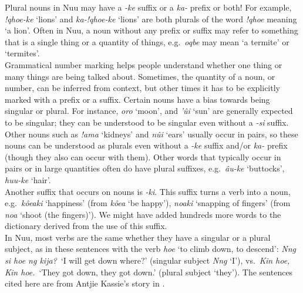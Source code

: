 Plural nouns in N\textipa{\textvertline}uu may have a \emph{-ke}
suffix or a \emph{ka-} prefix or both! For example, \emph{!qhoe-ke}
`lions' and \emph{ka-!qhoe-ke} `lions' are both plurals of the word
\emph{!qhoe} meaning `a lion'. Often in N\textipa{\textvertline}uu, a
noun without any prefix or suffix may refer to something that is a
single thing or a quantity of things, e.g.\
\emph{\textipa{\textdoublevertline}oqbe} may mean `a termite' or
`termites'.\\

Grammatical number marking helps people understand whether one thing
or many things are being talked about. Sometimes, the quantity of a
noun, or number, can be inferred from context, but other times it has
to be explicitly marked with a prefix or a suffix. Certain nouns have
a bias towards being singular or plural. For instance,
\emph{\textipa{\textdoublebarpipe}oro} `moon', and
\emph{\textipa{\textdoublevertline}'\^{u}i} `sun' are generally
expected to be singular; they can be understood to be singular even
without a \emph{-si} suffix. Other nouns such as \emph{!ama} `kidneys'
and \emph{n\textipa{\textdoublebarpipe}\^{u}i} `ears' usually occur in
pairs, so these nouns can be understood as plurals even without a
\emph{-ke} suffix and/or \emph{ka-} prefix (though they also can occur
with them). Other words that typically occur in pairs or in large
quantities often do have plural suffixes, e.g.\
\emph{\textipa{\textdoublebarpipe}\^{a}u-ke} `buttocks',
\emph{\textipa{\textvertline}huu-ke} `hair'.\\

Another suffix that occurs on nouns is \emph{-ki}. This suffix turns a
verb into a noun, e.g.\ \emph{k\^{o}eaki} `happiness' (from
\emph{k\^{o}ea} `be happy'), \emph{n\textipa{\textdoublebarpipe}oaki}
`snapping of fingers' (from \emph{n\textipa{\textdoublebarpipe}oa}
`shoot (the fingers)'). We might have added hundreds more words to the
dictionary derived from the use of this suffix.\\

In N\textipa{\textvertline}uu, most verbs are the same whether they
have a singular or a plural subject, as in these sentences with the
verb \emph{\textipa{\textdoublevertline}hoe} `to climb down, to
descend': \emph{N\textipa{\textvertline}ng si
\textipa{\textdoublevertline}hoe ng kija?}\ `I will get down where?'
(singular subject \emph{N\textipa{\textvertline}ng} `I'), vs.\
\emph{Kin \textipa{\textdoublevertline}hoe, Kin
\textipa{\textdoublevertline}hoe.}\ `They got down, they got down.'
(plural subject `they'). The sentences cited here are from Antjie
Kassie's story in \textcite{Collins2011}.\\


